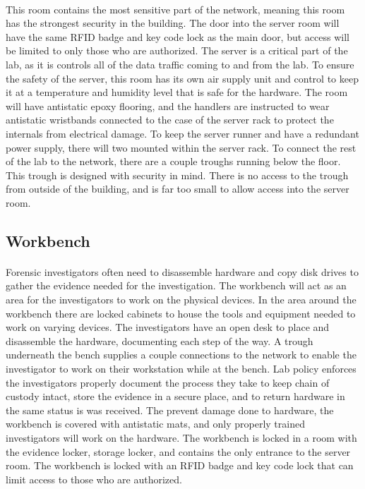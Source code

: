 \documentclass[12pt]{article}
\begin{document}
\paragraph{}
This room contains the most sensitive part of the network, meaning this room has the strongest security in the building.
The door into the server room will have the same RFID badge and key code lock as the main door, but access will be limited to only those who are authorized.
The server is a critical part of the lab, as it is controls all of the data traffic coming to and from the lab.
To ensure the safety of the server, this room has its own air supply unit and control to keep it at a temperature and humidity level that is safe for the hardware.
The room will have antistatic epoxy flooring, and the handlers are instructed to wear antistatic wristbands connected to the case of the server rack to protect the internals from electrical damage.
To keep the server runner and have a redundant power supply, there will two mounted within the server rack.
To connect the rest of the lab to the network, there are a couple troughs running below the floor.
This trough is designed with security in mind.
There is no access to the trough from outside of the building, and is far too small to allow access into the server room.

\subsection{Workbench}
\paragraph{}
Forensic investigators often need to disassemble hardware and copy disk drives to gather the evidence needed for the investigation.
The workbench will act as an area for the investigators to work on the physical devices.
In the area around the workbench there are locked cabinets to house the tools and equipment needed to work on varying devices.
The investigators have an open desk to place and disassemble the hardware, documenting each step of the way.
A trough underneath the bench supplies a couple connections to the network to enable the investigator to work on their workstation while at the bench.
Lab policy enforces the investigators properly document the process they take to keep chain of custody intact, store the evidence in a secure place, and to return hardware in the same status is was received.
The prevent damage done to hardware, the workbench is covered with antistatic mats, and only properly trained investigators will work on the hardware.
The workbench is locked in a room with the evidence locker, storage locker, and contains the only entrance to the server room.
The workbench is locked with an RFID badge and key code lock that can limit access to those who are authorized.
\end{document}
